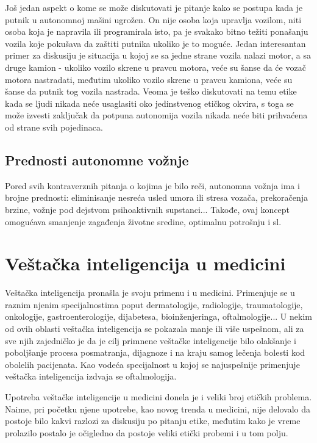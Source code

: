 \documentclass[a4paper]{article}
\begin{document}
Još jedan aspekt o kome se može diskutovati je pitanje kako se postupa kada je putnik u autonomnoj mašini ugrožen. On nije osoba koja upravlja vozilom, niti osoba koja je napravila ili programirala isto, pa je svakako bitno težiti ponašanju vozila koje pokušava da zaštiti putnika ukoliko je to moguće. Jedan interesantan primer za diskusiju je situacija u kojoj se sa jedne strane vozila nalazi motor, a sa druge kamion - ukoliko vozilo skrene u pravcu motora, veće su šanse da će vozač motora nastradati, međutim ukoliko vozilo skrene u pravcu kamiona, veće su šanse da putnik tog vozila nastrada. Veoma je teško diskutovati na temu etike kada se ljudi nikada neće usaglasiti oko jedinstvenog etičkog okvira, s toga se može izvesti zaključak da potpuna autonomija vozila nikada neće biti prihvaćena od strane svih pojedinaca.\\

\subsection{Prednosti autonomne vožnje}
\label{subsec:Prednosti autonomne vožnje}
Pored svih kontraverznih pitanja o kojima je bilo reči, autonomna vožnja ima i brojne prednosti: eliminisanje nesreća usled umora ili stresa vozača, prekoračenja brzine, vožnje pod dejstvom psihoaktivnih supstanci... Takođe, ovaj koncept omogućava smanjenje zagađenja životne sredine, optimalnu potrošnju i sl.




\section{Veštačka inteligencija u medicini}
\label{sec:upotreba_veštačke_intelijencije_u_medicini}

Veštačka inteligencija pronašla je svoju primenu i u medicini. Primenjuje se u raznim njenim specijalnostima poput dermatologije, radiologije, traumatologije, onkologije, gastroenterologije, dijabetesa, bioinženjeringa, oftalmologije... U nekim od ovih oblasti veštačka inteligencija se pokazala manje ili više uspešnom, ali za sve njih zajedničko je da je cilj primnene veštačke inteligencije bilo olakšanje i poboljšanje procesa posmatranja, dijagnoze i na kraju samog lečenja bolesti kod obolelih pacijenata. Kao vodeća specijalnost u kojoj se najuspešnije primenjuje veštačka inteligencija izdvaja se oftalmologija.

Upotreba veštačke inteligencije u medicini donela je i veliki broj etičkih problema. Naime, pri početku njene upotrebe, kao novog trenda u medicini, nije delovalo da postoje bilo kakvi razlozi za diskusiju po pitanju etike, %
međutim kako je vreme prolazilo postalo je očigledno da postoje veliki etički probemi i u tom polju.
\end{document}

